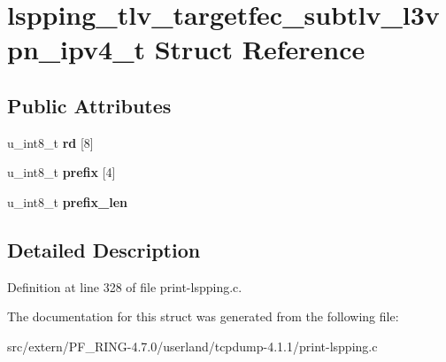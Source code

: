 \hypertarget{structlspping__tlv__targetfec__subtlv__l3vpn__ipv4__t}{
\section{lspping\_\-tlv\_\-targetfec\_\-subtlv\_\-l3vpn\_\-ipv4\_\-t Struct Reference}
\label{structlspping__tlv__targetfec__subtlv__l3vpn__ipv4__t}
}
\subsection*{Public Attributes}
\begin{DoxyCompactItemize}
\item 
\hypertarget{structlspping__tlv__targetfec__subtlv__l3vpn__ipv4__t_ae043088bb0ea7f8ea86514a897349abc}{
u\_\-int8\_\-t {\bfseries rd} \mbox{[}8\mbox{]}}
\label{structlspping__tlv__targetfec__subtlv__l3vpn__ipv4__t_ae043088bb0ea7f8ea86514a897349abc}

\item 
\hypertarget{structlspping__tlv__targetfec__subtlv__l3vpn__ipv4__t_a5bb840946ccab134e801508309a86c54}{
u\_\-int8\_\-t {\bfseries prefix} \mbox{[}4\mbox{]}}
\label{structlspping__tlv__targetfec__subtlv__l3vpn__ipv4__t_a5bb840946ccab134e801508309a86c54}

\item 
\hypertarget{structlspping__tlv__targetfec__subtlv__l3vpn__ipv4__t_ad269a055ca09f0f7cb525a3035039691}{
u\_\-int8\_\-t {\bfseries prefix\_\-len}}
\label{structlspping__tlv__targetfec__subtlv__l3vpn__ipv4__t_ad269a055ca09f0f7cb525a3035039691}

\end{DoxyCompactItemize}


\subsection{Detailed Description}


Definition at line 328 of file print-\/lspping.c.



The documentation for this struct was generated from the following file:\begin{DoxyCompactItemize}
\item 
src/extern/PF\_\-RING-\/4.7.0/userland/tcpdump-\/4.1.1/print-\/lspping.c\end{DoxyCompactItemize}
